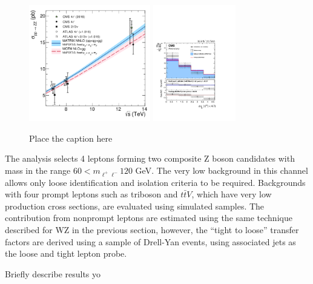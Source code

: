 \documentclass[10pt]{article}
\begin{document}
\begin{figure}[htb]
  \centering
    \includegraphics[height=2in]{figures/ZZCrossSection_vs_sqrtS.pdf}
    \includegraphics[height=2in]{figures/ZZ_13TeV_dEtajj_unfolded.pdf}
  \caption{ Place the caption here}
  \label{fig:ZZinclusive}
\end{figure}

The analysis selects 4 leptons forming two composite Z boson candidates with
mass in the range $60 < m_{\ell^{+}\ell^{-}} 120$ GeV. The very low background
in this channel allows only loose identification and isolation criteria to 
be required. Backgrounds with four prompt leptons such as triboson and $t\bar{t}V$, 
which have very
low production cross sections, are evaluated using simulated samples. The 
contribution from nonprompt leptons are estimated using the same technique
described for WZ in the previous section, however, the ``tight to loose'' transfer 
factors are derived using a sample of Drell-Yan events, using associated 
jets as the loose and tight lepton probe.

Briefly describe results yo
\end{document}
